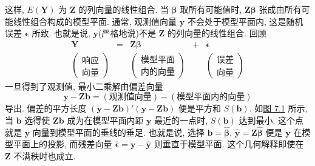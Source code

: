 
这样, $E(\mathbf{Y})$ 为 $\mathbf{Z}$ 的列向量的线性组合. 当 $\boldsymbol{\beta}$ 取所有可能值时, $\mathbf{Z}\boldsymbol{\beta}$ 张成由所有可能线性组合构成的模型平面. 通常, 观测值向量 $\mathbf{y}$ 不会处于模型平面内, 这是随机误差 $\boldsymbol{\epsilon}$ 所致. 也就是说, $\mathbf{y}$(严格地说)不是 $\mathbf{Z}$ 的列向量的线性组合. 回顾
\[
\begin{array}{ccccc}
\mathbf{Y}&=&\mathbf{Z}\boldsymbol{\beta}&+&\boldsymbol{\epsilon}\\[6pt]
\left(\begin{array}{c}\text{响应}\\\text{向量}\end{array}\right)&{}&
\left(\begin{array}{c}\text{模型平面}\\\text{内的向量}\end{array}\right)&{}&
\left(\begin{array}{c}\text{误差}\\\text{向量}\end{array}\right)
\end{array}
\]
一旦得到了观测值, 最小二乘解由偏差向量
\[
\mathbf{y}-\mathbf{Z}\mathbf{b}=(\text{观测值向量})-(\text{模型平面内的向量})
\]
导出. 偏差的平方长度 $(\mathbf{y}-\mathbf{Z}\mathbf{b})'(\mathbf{y}-\mathbf{Z}\mathbf{b})$ 便是平方和 $S(\mathbf{b})$. 如\hyperref[fig:7.1]{图 7.1} 所示, 当 $\mathbf{b}$ 选得使 $\mathbf{Z}\mathbf{b}$ 成为在模型平面内距 $\mathbf{y}$ 最近的一点时, $S(\mathbf{b})$ 达到最小. 这个点就是 $\mathbf{y}$ 向量到模型平面的垂线的垂足. 也就是说, 选择 $\mathbf{b}=\hat{\boldsymbol{\beta}}$, $\hat{\mathbf{y}}=\mathbf{Z}\hat{\boldsymbol{\beta}}$ 便是 $\mathbf{y}$ 在模型平面上的投影, 而残差向量 $\hat{\boldsymbol{\epsilon}}=\mathbf{y}-\hat{\mathbf{y}}$ 则垂直于模型平面. 这个几何解释即使在 $\mathbf{Z}$ 不满秩时也成立.

